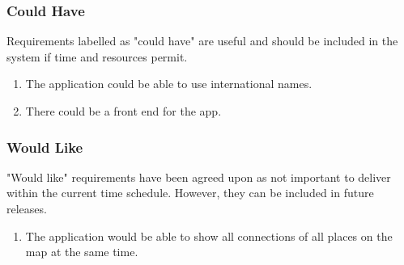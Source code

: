 \subsubsection {Could Have}
Requirements labelled as "could have" are useful and should be included in the system if time and resources permit.

\begin{enumerate}
    \item The application could be able to use international names.
    \item There could be a front end for the app.
\end{enumerate}

\subsubsection {Would Like}
"Would like" requirements have been agreed upon as not important to deliver within the current time schedule. However, they can be included in future releases.

\begin{enumerate}
    \item The application would be able to show all connections of all places on the map at the same time.
\end{enumerate}


